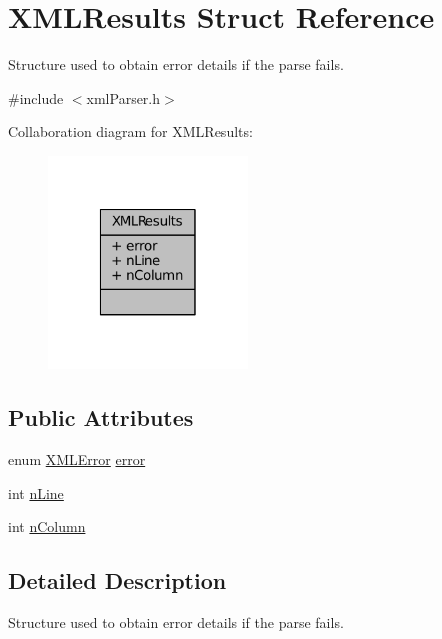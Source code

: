 \hypertarget{structXMLResults}{\section{X\-M\-L\-Results Struct Reference}
\label{structXMLResults}
}


Structure used to obtain error details if the parse fails.  




{\ttfamily \#include $<$xml\-Parser.\-h$>$}



Collaboration diagram for X\-M\-L\-Results\-:
\nopagebreak
\begin{figure}[H]
\begin{center}
\leavevmode
\includegraphics[width=150pt]{structXMLResults__coll__graph}
\end{center}
\end{figure}
\subsection*{Public Attributes}
\begin{DoxyCompactItemize}
\item 
enum \hyperlink{xmlParser_8h_ac39bd07b1461aaa70afffe2d7162b4f5}{X\-M\-L\-Error} \hyperlink{structXMLResults_adb341083266eabf9fe45587b838c0962}{error}
\item 
int \hyperlink{structXMLResults_a8741d887c2843fc1ce8fffc12f662595}{n\-Line}
\item 
int \hyperlink{structXMLResults_af0d1358dbb7b124d2e8e4d9052509c8e}{n\-Column}
\end{DoxyCompactItemize}


\subsection{Detailed Description}
Structure used to obtain error details if the parse fails. 

